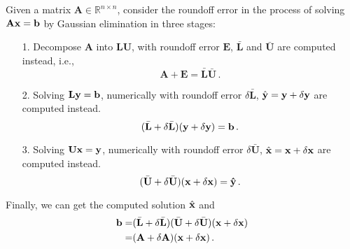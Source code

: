 \documentclass[english,onecolumn]{IEEEtran}
\begin{document}
Given a matrix $\mathbf{A}\in \mathbb{R}^{n\times n}$, consider the roundoff error in the process of solving $\mathbf{A}\bf{x} = \bf{b}$ by Gaussian elimination in three stages:
\begin{enumerate}
    \item[1.] Decompose $\mathbf{A}$ into $\mathbf{L}\mathbf{U}$, with roundoff error $\mathbf{E}$, $\bar{\mathbf{L}}$ and $\bar{\mathbf{U}}$ are computed instead, i.e., 
    \begin{equation*}
        \mathbf{A} + \mathbf{E} = \bar{\mathbf{L}}\bar{\mathbf{U}}\,.
    \end{equation*}
    \item[2.] Solving $\mathbf{L}\bf{y} = \bf{b}$, numerically with roundoff error $\delta \mathbf{\bar{L}}$, $\hat{\mathbf{y}} = \bf{y}+\delta \bf{y}$ are computed instead.
    \begin{equation*}
        (\bar{\mathbf{L}}+\delta \bar{\mathbf{L}})(\bf{y}+\delta \bf{y}) = \bf{b}\,.
    \end{equation*}
    \item[3.] Solving $\mathbf{U}\bf{x} = \bf{y}$, numerically with roundoff error $\delta \mathbf{\bar{U}}$, $\hat{\bf{x}} = \bf{x}+\delta \bf{x}$ are computed instead.
    \begin{equation*}
        (\bar{\mathbf{U}}+\delta \bar{\mathbf{U}})(\bf{x}+\delta \bf{x}) = \hat{y}\,.
    \end{equation*}
    
\end{enumerate}
Finally, we can get the computed solution $\hat{\bf{x}}$ and 
\begin{align*}
    \bf{b} = &(\bar{\mathbf{L}}+\delta \bar{\mathbf{L}})(\bar{\mathbf{U}}+\delta \bar{\mathbf{U}})(\bf{x}+\delta \bf{x})\\
     = & (\mathbf{A}+\delta \mathbf{A})(\bf{\bf{x}}+\delta \bf{\bf{x}})\,.
\end{align*}
\end{document}
